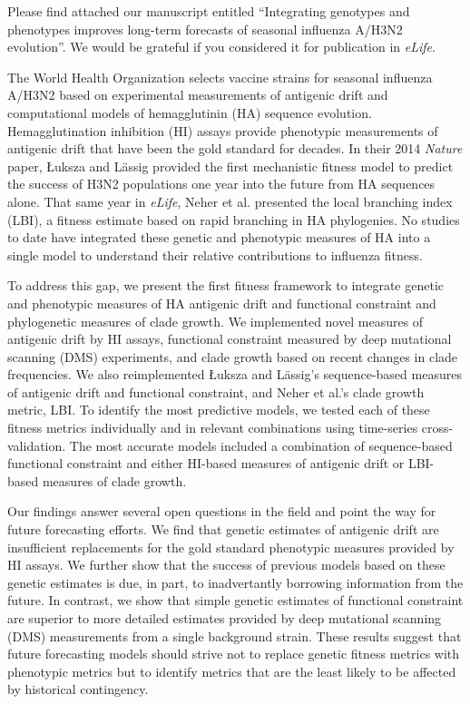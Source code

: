 \documentclass[stdletter,letterpaper,addrfromright,orderfromdateto,dateleft,11pt,noaddrto,sigleft]{newlfm}
\begin{document}
\begin{newlfm}
  Please find attached our manuscript entitled ``Integrating genotypes and phenotypes improves long-term forecasts of seasonal influenza A/H3N2 evolution''.
  We would be grateful if you considered it for publication in \textit{eLife}.

  The World Health Organization selects vaccine strains for seasonal influenza A/H3N2 based on experimental measurements of antigenic drift and computational models of hemagglutinin (HA) sequence evolution.
  Hemagglutination inhibition (HI) assays provide phenotypic measurements of antigenic drift that have been the gold standard for decades.
  In their 2014 \textit{Nature} paper, {\L}uksza and L\"assig provided the first mechanistic fitness model to predict the success of H3N2 populations one year into the future from HA sequences alone.
  That same year in \textit{eLife}, Neher et al. presented the local branching index (LBI), a fitness estimate based on rapid branching in HA phylogenies.
  No studies to date have integrated these genetic and phenotypic measures of HA into a single model to understand their relative contributions to influenza fitness.

  To address this gap, we present the first fitness framework to integrate genetic and phenotypic measures of HA antigenic drift and functional constraint and phylogenetic measures of clade growth.
  We implemented novel measures of antigenic drift by HI assays, functional constraint measured by deep mutational scanning (DMS) experiments, and clade growth based on recent changes in clade frequencies.
  We also reimplemented {\L}uksza and L\"assig's sequence-based measures of antigenic drift and functional constraint, and Neher et al.'s clade growth metric, LBI.
  To identify the most predictive models, we tested each of these fitness metrics individually and in relevant combinations using time-series cross-validation.
  The most accurate models included a combination of sequence-based functional constraint and either HI-based measures of antigenic drift or LBI-based measures of clade growth.

  Our findings answer several open questions in the field and point the way for future forecasting efforts.
  We find that genetic estimates of antigenic drift are insufficient replacements for the gold standard phenotypic measures provided by HI assays.
  We further show that the success of previous models based on these genetic estimates is due, in part, to inadvertantly borrowing information from the future.
  In contrast, we show that simple genetic estimates of functional constraint are superior to more detailed estimates provided by deep mutational scanning (DMS) measurements from a single background strain.
  These results suggest that future forecasting models should strive not to replace genetic fitness metrics with phenotypic metrics but to identify metrics that are the least likely to be affected by historical contingency.


\end{newlfm}
\end{document}
